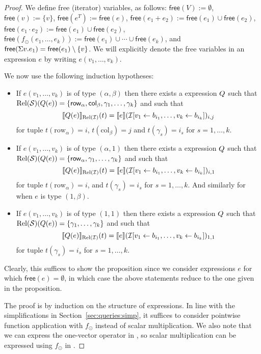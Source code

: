 \begin{proof}
We define free (iterator) variables, as follows:
$\mathsf{free}(V):=\emptyset$, $\mathsf{free}(v):=\{v\}$, $\mathsf{free}(e^T):=\mathsf{free}(e)$, $\mathsf{free}(e_1+e_2):=\mathsf{free}(e_1)\cup \mathsf{free}(e_2)$, $\mathsf{free}(e_1\cdot e_2):=\mathsf{free}(e_1)\cup \mathsf{free}(e_2)$,
 $\mathsf{free}(f_\odot(e_1,\ldots,e_k)):=\mathsf{free}(e_1)\cup\cdots \cup \mathsf{free}(e_k)$, and $\mathsf{free}(\Sigma v. e_1)=\mathsf{free}(e_1)\setminus\{v\}$. We will explicitly denote the free variables in an expression $e$ by writing $e(v_1,\ldots,v_k)$.

We now use the following induction hypotheses:
\begin{itemize}
	\item If $e(v_1,\ldots,v_k)$ is of type $(\alpha,\beta)$ then there exists a
	\rak expression $Q$ such that $\text{Rel}(\mathcal{S})(Q(e))=\{\mathsf{row}_\alpha,\mathsf{col}_\beta,\gamma_1,\ldots,\gamma_k\}$
	and such that 
	$$
	\llbracket Q(e) \rrbracket_{\text{Rel}(\mathcal{I})}(t)=\llbracket e \rrbracket(\mathcal{I}[v_1\gets b_{i_1},\ldots,v_k\gets b_{i_k}])_{i,j}
	$$
	for tuple $t(\mathrm{row}_\alpha)=i$, $t(\mathrm{col}_\beta)=j$ and $t(\gamma_s)=i_s$ for $s=1,\ldots, k$.
	\item If $e(v_1,\ldots,v_k)$ is of type $(\alpha,1)$ then there exists a
	\rak expression $Q$ such that $\text{Rel}(\mathcal{S})(Q(e))=\{\mathsf{row}_\alpha,\gamma_1,\ldots,\gamma_k\}$
	and such that 
	$$
	\llbracket Q(e) \rrbracket_{\text{Rel}(\mathcal{I})}(t)=\llbracket e \rrbracket(\mathcal{I}[v_1\gets b_{i_1},\ldots,v_k\gets b_{i_k}])_{i,1}
	$$
	for tuple $t(\mathrm{row}_\alpha)=i$,  and $t(\gamma_s)=i_s$ for $s=1,\ldots, k$.
	And similarly for when $e$ is type $(1,\beta)$.
	\item If $e(v_1,\ldots,v_k)$ is of type $(1,1)$ then there exists a
	\rak expression $Q$ such that $\text{Rel}(\mathcal{S})(Q(e))=\{\gamma_1,\ldots,\gamma_k\}$
	and such that 
	$$
	\llbracket Q(e) \rrbracket_{\text{Rel}(\mathcal{I})}(t)=\llbracket e \rrbracket(\mathcal{I}[v_1\gets b_{i_1},\ldots,v_k\gets b_{i_k}])_{1,1}
	$$
	for tuple $t(\gamma_s)=i_s$ for $s=1,\ldots, k$.
\end{itemize}
Clearly, this suffices to show the proposition since we consider expressions $e$ for which $\mathsf{free}(e)=\emptyset$, in which case the above statements reduce to the one given in the proposition.


The proof is by induction on the structure of \langsum expressions. In line with the simplifications in Section~\ref{sec:queries:simp}, it suffices to consider pointwise function application with $f_\odot$ instead of scalar multiplication. 
We also note that we can express the one-vector operator in \langsum, so scalar multiplication can be expressed using $f_\odot$ in \langsum.


\end{proof}
